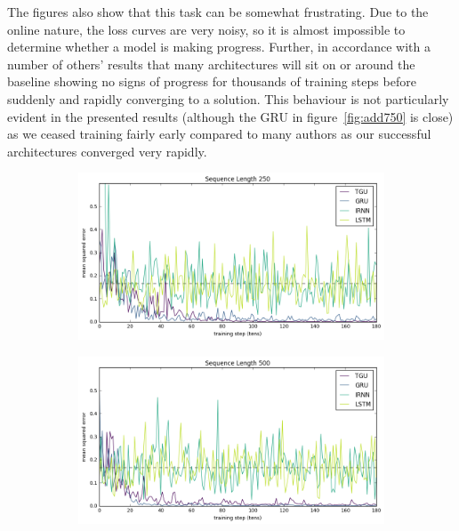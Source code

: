 The figures also show that this task can be somewhat frustrating. Due to the online nature, the loss
curves are very noisy, so it is almost impossible to determine whether a model is making progress.
Further, in accordance with a number of others' results \autocite{Le2015, Arjovsky2015} that many
architectures will sit on or around the baseline showing no signs of progress for thousands of
training steps before suddenly and rapidly converging to a solution. This behaviour is not particularly
evident in the presented results (although the GRU in figure~\ref{fig:add750} is close) as we ceased
training fairly early compared to many authors as our successful architectures converged very rapidly.

\begin{figure}
\centering
\begin{subfigure}[t]{0.75\textwidth}
\includegraphics[width=\textwidth]{exps/addition/sl250}
\caption{}
\label{fig:add250}
\end{subfigure}

\begin{subfigure}[t]{0.75\textwidth}
\includegraphics[width=\textwidth]{exps/addition/sl500}
\caption{}
\label{fig:add500}
\end{subfigure}


\end{figure}
